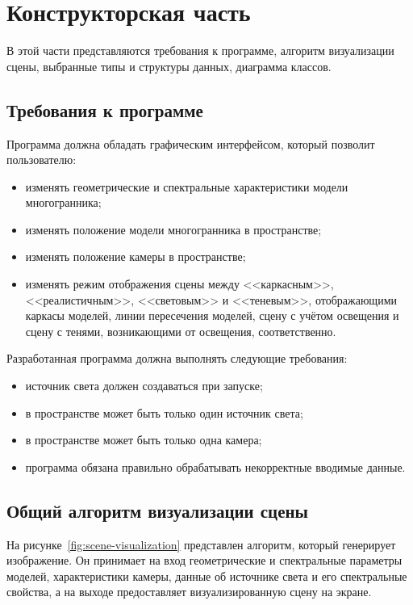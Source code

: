 \chapter{Конструкторская часть}

В этой части представляются требования к программе, алгоритм визуализации сцены, выбранные типы и структуры данных, диаграмма классов.

\section{Требования к программе}

Программа должна обладать графическим интерфейсом, который позволит пользователю:
\begin{itemize}[label=--]
	\item изменять геометрические и спектральные характеристики модели многогранника;
	\item изменять положение модели многогранника в пространстве;
	\item изменять положение камеры в пространстве;
	\item изменять режим отображения сцены между <<каркасным>>, <<реалистичным>>, <<световым>> и <<теневым>>, отображающими каркасы моделей, линии пересечения моделей, сцену с учётом освещения и сцену с тенями, возникающими от освещения, соответственно.
\end{itemize}

Разработанная программа должна выполнять следующие требования:
\begin{itemize}[label=--]
	\item источник света должен создаваться при запуске;
	\item в пространстве может быть только один источник света;
	\item в пространстве может быть только одна камера;
	\item программа обязана правильно обрабатывать некорректные вводимые данные.
\end{itemize}

\section{Общий алгоритм визуализации сцены}

На рисунке~\ref{fig:scene-visualization} представлен алгоритм, который генерирует изображение. Он принимает на вход геометрические и спектральные параметры моделей, характеристики камеры, данные об источнике света и его спектральные свойства, а на выходе предоставляет визуализированную сцену на экране.


